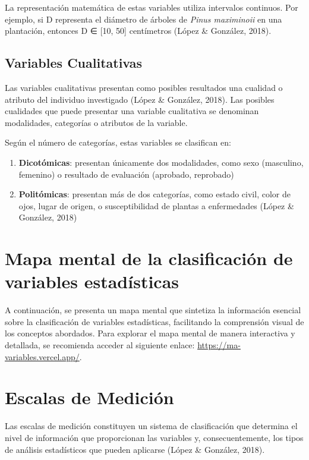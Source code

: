 \documentclass[
  spanish,
  letterpaper,
]{book}
\begin{document}
La representación matemática de estas variables utiliza intervalos
continuos. Por ejemplo, si D representa el diámetro de árboles de
\emph{Pinus maximinoii} en una plantación, entonces D ∈ {[}10, 50{]}
centímetros (López \& González, 2018).

\subsection{Variables Cualitativas}\label{variables-cualitativas}

Las variables cualitativas presentan como posibles resultados una
cualidad o atributo del individuo investigado (López \& González, 2018).
Las posibles cualidades que puede presentar una variable cualitativa se
denominan modalidades, categorías o atributos de la variable.

Según el número de categorías, estas variables se clasifican en:

\begin{enumerate}
\def\labelenumi{\arabic{enumi}.}
\item
  \textbf{Dicotómicas}: presentan únicamente dos modalidades, como sexo
  (masculino, femenino) o resultado de evaluación (aprobado, reprobado)
\item
  \textbf{Politómicas}: presentan más de dos categorías, como estado
  civil, color de ojos, lugar de origen, o susceptibilidad de plantas a
  enfermedades (López \& González, 2018)
\end{enumerate}

\section{Mapa mental de la clasificación de variables
estadísticas}\label{mapa-mental-de-la-clasificaciuxf3n-de-variables-estaduxedsticas}

A continuación, se presenta un mapa mental que sintetiza la información
esencial sobre la clasificación de variables estadísticas, facilitando
la comprensión visual de los conceptos abordados. Para explorar el mapa
mental de manera interactiva y detallada, se recomienda acceder al
siguiente enlace: \url{https://ma-variables.vercel.app/}.

\section{Escalas de Medición}\label{escalas-de-mediciuxf3n}

Las escalas de medición constituyen un sistema de clasificación que
determina el nivel de información que proporcionan las variables y,
consecuentemente, los tipos de análisis estadísticos que pueden
aplicarse (López \& González, 2018).
\end{document}
